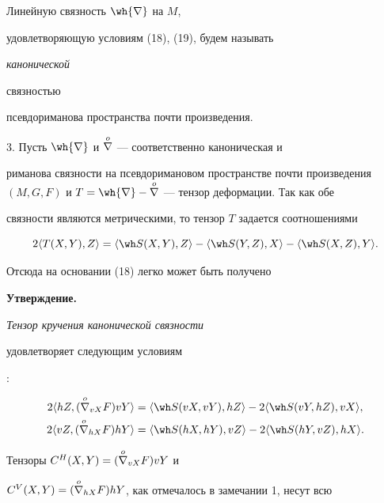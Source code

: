 \begin{defn}


Линейную связность $\wh{\nb}$ на $M$,


удовлетворяющую условиям (18), (19), будем называть {\it канонической


связностью} псевдориманова пространства почти произведения.


\end{defn}





3. Пусть $\wh{\nb}$ и $\overset{o}{\nabla}{}$ --- соответственно каноническая и


риманова связности на псевдоримановом пространстве почти произведения $(M,


G, F)$ и $ T=\wh{\nb} - \os{\nb}{o}$ --- тензор деформации. Так как обе


связности являются метрическими, то тензор $T$ задается соотношениями


$$


2\langle T(X,Y),Z\rangle=\langle\wh S(X,Y),Z\rangle-


\langle\wh S(Y,Z),X\rangle-\langle\wh S(X,Z),Y\rangle.


$$


Отсюда на основании (18) легко может быть получено


\medskip





{\bf Утверждение.} {\it Тензор кручения канонической связности


удовлетворяет следующим условиям}:


\begin{align}


2\langle hZ, (\os{\nb}{o}_{vX}F)vY\rangle &=


\langle\wh S(vX,vY),hZ\rangle - 2\langle\wh S(vY,hZ),vX\rangle,\\


%


2\langle vZ,(\os{\nb}{o}_{hX}F)hY\rangle &=


\langle\wh S(hX,hY),vZ\rangle - 2\langle\wh S(hY,vZ),hX\rangle.


\end{align}





Тензоры $C^H(X,Y)=(\overset{o}{\nabla}{}_{vX}F)vY$ и


$C^V(X,Y)=(\overset{o}{\nabla}{}_{hX}F)hY$, как отмечалось в замечании 1, несут всю


